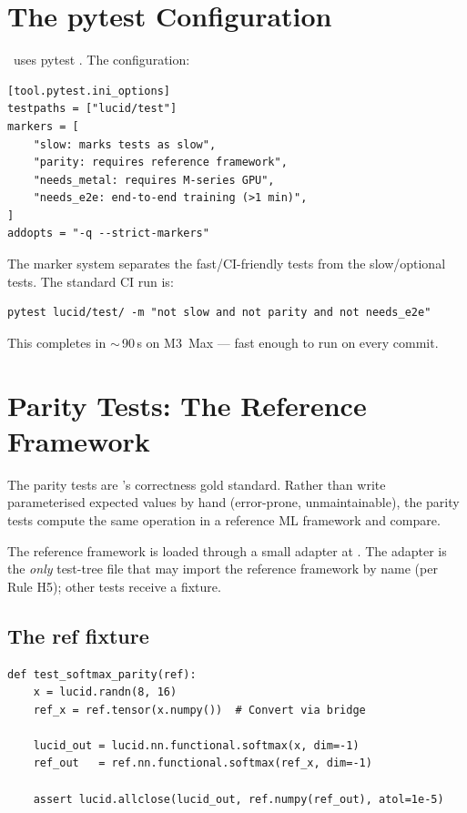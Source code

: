 \section{The pytest Configuration}
\label{sec:testing:pytest_config}

\Lucid\ uses pytest \cite{pytest_krekel}. The 
configuration:

\begin{lstlisting}[style=lucid,language=LucidPython]
[tool.pytest.ini_options]
testpaths = ["lucid/test"]
markers = [
    "slow: marks tests as slow",
    "parity: requires reference framework",
    "needs_metal: requires M-series GPU",
    "needs_e2e: end-to-end training (>1 min)",
]
addopts = "-q --strict-markers"
\end{lstlisting}

The marker system separates the fast/CI-friendly tests from the
slow/optional tests. The standard CI run is:

\begin{lstlisting}[style=lucid,language=LucidPython]
pytest lucid/test/ -m "not slow and not parity and not needs_e2e"
\end{lstlisting}

This completes in $\sim$\,90\,s on M3~Max --- fast enough to
run on every commit.

\section{Parity Tests: The Reference Framework}
\label{sec:testing:parity_framework}

The parity tests are \Lucid's correctness gold standard. Rather
than write parameterised expected values by hand (error-prone,
unmaintainable), the parity tests compute the same operation
in a reference ML framework and compare.

The reference framework is loaded through a small adapter at
. The adapter is
the \emph{only} test-tree file that may import the reference
framework by name (per Rule H5); other tests receive a
 fixture.

\subsection{The ref fixture}
\label{ssec:testing:ref_fixture}

\begin{lstlisting}[style=lucid,language=LucidPython]
def test_softmax_parity(ref):
    x = lucid.randn(8, 16)
    ref_x = ref.tensor(x.numpy())  # Convert via bridge

    lucid_out = lucid.nn.functional.softmax(x, dim=-1)
    ref_out   = ref.nn.functional.softmax(ref_x, dim=-1)

    assert lucid.allclose(lucid_out, ref.numpy(ref_out), atol=1e-5)
\end{lstlisting}

